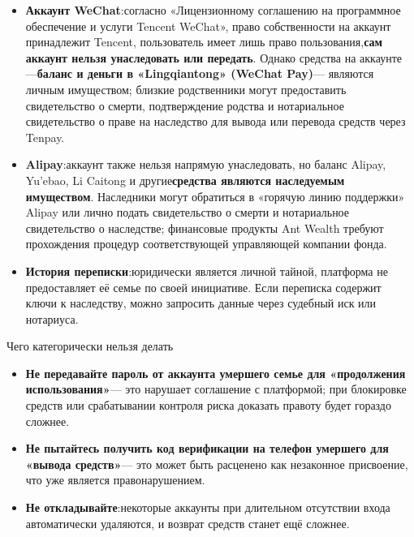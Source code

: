\begin{itemize}
  \item \textbf{Аккаунт WeChat}:согласно «Лицензионному соглашению на программное обеспечение и услуги Tencent WeChat», право собственности на аккаунт принадлежит Tencent, пользователь имеет лишь право пользования,\textbf{сам аккаунт нельзя унаследовать или передать}. Однако средства на аккаунте —\textbf{баланс и деньги в «Lingqiantong» (WeChat Pay)}— являются личным имуществом; близкие родственники могут предоставить свидетельство о смерти, подтверждение родства и нотариальное свидетельство о праве на наследство для вывода или перевода средств через Tenpay.
  \item \textbf{Alipay}:аккаунт также нельзя напрямую унаследовать, но баланс Alipay, Yu'ebao, Li Caitong и другие\textbf{средства являются наследуемым имуществом}. Наследники могут обратиться в «горячую линию поддержки» Alipay или лично подать свидетельство о смерти и нотариальное свидетельство о наследстве; финансовые продукты Ant Wealth требуют прохождения процедур соответствующей управляющей компании фонда.
  \item \textbf{История переписки}:юридически является личной тайной, платформа не предоставляет её семье по своей инициативе. Если переписка содержит ключи к наследству, можно запросить данные через судебный иск или нотариуса.
\end{itemize}

\begin{tcbwarn}{Чего категорически нельзя делать}
\begin{itemize}
  \item \textbf{Не передавайте пароль от аккаунта умершего семье для «продолжения использования»}— это нарушает соглашение с платформой; при блокировке средств или срабатывании контроля риска доказать правоту будет гораздо сложнее.
  \item \textbf{Не пытайтесь получить код верификации на телефон умершего для «вывода средств»}— это может быть расценено как незаконное присвоение, что уже является правонарушением.
  \item \textbf{Не откладывайте}:некоторые аккаунты при длительном отсутствии входа автоматически удаляются, и возврат средств станет ещё сложнее.
\end{itemize}

\end{tcbwarn}


